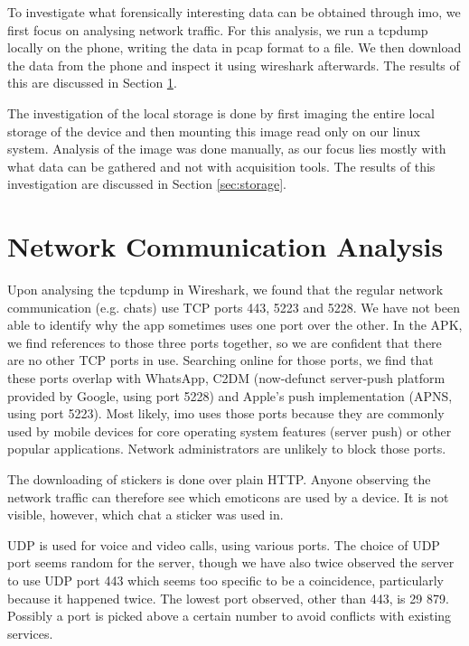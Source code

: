 \documentclass[conference]{IEEEtran}
\begin{document}
To investigate what forensically interesting data can be obtained through imo,
we first focus on analysing network traffic. For this analysis, we run a tcpdump
locally on the phone, writing the data in pcap format to a file. We then download
the data from the phone and inspect it using wireshark afterwards. The
results of this are discussed in Section \ref{sec:network}.

The investigation of the local storage is done by first imaging the entire local
storage of the device and then mounting this image read only on our linux
system. Analysis of the image was done manually, as our focus lies mostly with
what data can be gathered and not with acquisition tools. The results of this
investigation are discussed in Section \ref{sec:storage}.


\section{Network Communication Analysis}\label{sec:network}

Upon analysing the tcpdump in Wireshark, we found that the regular network
communication (e.g. chats) use TCP ports 443, 5223 and 5228. We have not been
able to identify why the app sometimes uses one port over the other. In the APK,
we find references to those three ports together, so we are confident that there
are no other TCP ports in use.  Searching online for those ports, we find that
these ports overlap with WhatsApp, C2DM (now-defunct server-push platform
provided by Google, using port 5228) and Apple's push implementation (APNS,
using port 5223). Most likely, imo uses those ports because they are commonly
used by mobile devices for core operating system features (server push) or other
popular applications. Network administrators are unlikely to block those ports.

The downloading of stickers is done over plain HTTP. Anyone observing the
network traffic can therefore see which emoticons are used by a device. It is
not visible, however, which chat a sticker was used in.

UDP is used for voice and video calls, using various ports. The choice of UDP
port seems random for the server, though we have also twice observed the server
to use UDP port 443 which seems too specific to be a coincidence, particularly
because it happened twice. The lowest port observed, other than 443, is 29 879.
Possibly a port is picked above a certain number to avoid conflicts with
existing services.
\end{document}
